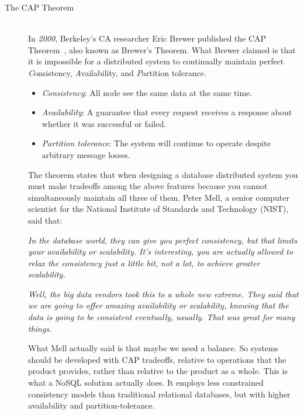 \begin{description}\label{item:cap}
  \item[The CAP Theorem] \hfill \\
    In \emph{2000}, Berkeley's CA researcher Eric Brewer published the CAP
    Theorem~, also known as
    Brewer's Theorem. What Brewer claimed is that it is impossible for a
    distributed system to continually maintain perfect \emph{C}onsistency,
    \emph{A}vailability, and \emph{P}artition tolerance.

    \begin{itemize}
      \item \emph{Consistency}: All node see the same data at the same time.
      \item \emph{Availability}: A guarantee that every request receives a
            response about whether it was successful or failed.
      \item \emph{Partition tolerance}: The system will continue to operate
            despite arbitrary message losses.
    \end{itemize}

    The theorem states that when designing a database distributed system you
    must make tradeoffs among the above features because you cannot
    simultaneously maintain all three of them. Peter Mell, a senior computer
    scientist for the National Institute of Standards and Technology (NIST),
    said that:

    \begin{flushright}
      \emph{In the database world, they can give you perfect consistency, but
            that limits your availability or scalability. It’s interesting, you
            are actually allowed to relax the consistency just a little bit, not
            a lot, to achieve greater scalability.}

      \emph{Well, the big data vendors took this to a whole new extreme. They
            said that we are going to offer amazing availability or scalability,
            knowing that the data is going to be consistent eventually, usually.
            That was great for many things.}~\cite{peter_mell}
    \end{flushright}

    What Mell actually said is that maybe we need a balance. So systems should
    be developed with CAP tradeoffs, relative to operations that the product
    provides, rather than relative to the product as a whole. This is what a
    NoSQL solution actually does. It employs less constrained consistency models
    than traditional relational databases, but with higher availability and
    partition-tolerance.


\end{description}
